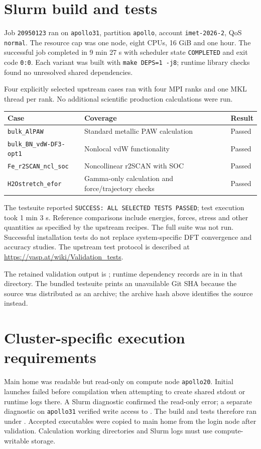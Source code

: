 \documentclass[10pt,a4paper]{article}
\begin{document}
\section{Slurm build and tests}
Job \texttt{20950123} ran on \texttt{apollo31}, partition \texttt{apollo},
account \texttt{imet-2026-2}, QoS \texttt{normal}.
The resource cap was one node, eight CPUs, 16 GiB and one hour.
The successful job completed in 9 min 27 s with scheduler state
\texttt{COMPLETED} and exit code \texttt{0:0}.
Each variant was built with \texttt{make DEPS=1 -j8}; runtime library checks
found no unresolved shared dependencies.

Four explicitly selected upstream cases ran with four MPI ranks and one
MKL thread per rank. No additional scientific production calculations were run.
\begin{tabularx}{\linewidth}{@{}lXl@{}}
\toprule
Case & Coverage & Result \\
\midrule
\texttt{bulk\_AlPAW} & Standard metallic PAW calculation & Passed \\
\texttt{bulk\_BN\_vdW-DF3-opt1} & Nonlocal vdW functionality & Passed \\
\texttt{Fe\_r2SCAN\_ncl\_soc} & Noncollinear r2SCAN with SOC & Passed \\
\texttt{H2Ostretch\_efor} & Gamma-only calculation and force/trajectory checks & Passed \\
\bottomrule
\end{tabularx}

The testsuite reported \texttt{SUCCESS: ALL SELECTED TESTS PASSED}; test execution
took 1 min 3 s. Reference comparisons include energies, forces, stress and
other quantities as specified by the upstream recipes.
The full suite was not run. Successful installation tests do not replace
system-specific DFT convergence and accuracy studies.
The upstream test protocol is described at
\url{https://vasp.at/wiki/Validation_tests}.

The retained validation output is
;
runtime dependency records are in  in that directory.
The bundled testsuite prints an unavailable Git SHA because the source was
distributed as an archive; the archive hash above identifies the source instead.

\section{Cluster-specific execution requirements}
Main home was readable but read-only on compute node \texttt{apollo20}.
Initial launches failed before compilation when attempting to create shared
stdout or runtime logs there. A Slurm diagnostic confirmed the read-only error;
a separate diagnostic on \texttt{apollo31} verified write access to
. The build and tests therefore ran under
.
Accepted executables were copied to main home from the login node after validation.
Calculation working directories and Slurm logs must use compute-writable storage.
\end{document}
